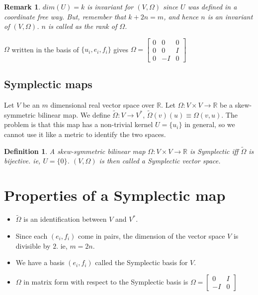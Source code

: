 \documentclass[11pt]{book}
\newcommand{\R}{\ensuremath{\mathbb R}}
\newtheorem{definition}{Definition}
\newtheorem{remark}{Remark}
\begin{document}
\begin{remark}
    $dim(U) = k$ is invariant for $(V, \Omega)$ since $U$ was defined in a
    coordinate free way. But, remember that $k + 2n = m$, and hence $n$
    is an invariant of $(V, \Omega)$. $n$ is called as the \emph{rank} of
    $\Omega$.
\end{remark}

$\Omega$ written in the basis of $\{ u_i, e_i, f_i\}$ gives 
$\Omega = \begin{bmatrix} 0 & 0 & 0 \\ 0 & 0 & I \\ 0 & -I & 0 \end{bmatrix}$

\subsection{Symplectic maps}

Let $V$ be an $m$ dimensional real vector space over \R. Let $\Omega: V \times V \rightarrow \mathbb{R}$
be a skew-symmetric bilinear map. We define 
$\tilde \Omega: V \rightarrow V^*$, $\tilde \Omega(v)(u) \equiv \Omega(v, u)$. 
The problem is that this map has a non-trivial kernel $U = \{ u_i \}$ in general,
so we cannot use it like a metric to identify the two spaces.

\begin{definition} A skew-symmetric bilinear map $\Omega: V \times V \rightarrow \R$ is Symplectic iff
    $\tilde \Omega$ is bijective. ie, $U = \{ 0\}$. $(V, \Omega)$ is then
    called a Symplectic vector space.
\end{definition}

\section{Properties of a Symplectic map}
\begin{itemize}
    \item $\tilde \Omega$ is an identification between $V$ and $V^*$.
    \item Since each $(e_i, f_i)$ come in pairs, the dimension of the vector space $V$ is divisible by $2$. ie, $m = 2n$.
    \item We have a basis $(e_i, f_i)$ called the Symplectic basis for $V$.
    \item $\Omega$ in matrix form with respect to the Symplectic basis is $\Omega = \begin{bmatrix} 0 & I \\ -I & 0 \end{bmatrix}$
\end{itemize}
\end{document}
